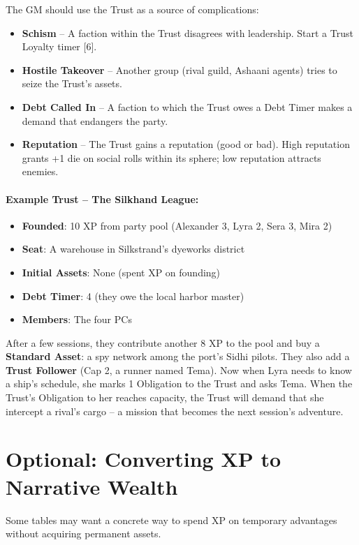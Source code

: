 The GM should use the Trust as a source of complications:

\begin{itemize}
  \item \textbf{Schism} -- A faction within the Trust disagrees with leadership. Start a Trust Loyalty timer [6].
  \item \textbf{Hostile Takeover} -- Another group (rival guild, Ashaani agents) tries to seize the Trust's assets.
  \item \textbf{Debt Called In} -- A faction to which the Trust owes a Debt Timer makes a demand that endangers the party.
  \item \textbf{Reputation} -- The Trust gains a reputation (good or bad). High reputation grants +1 die on social rolls within its sphere; low reputation attracts enemies.
\end{itemize}

\paragraph{Example Trust -- The Silkhand League:}
\begin{itemize}
  \item \textbf{Founded}: 10 XP from party pool (Alexander 3, Lyra 2, Sera 3, Mira 2)
  \item \textbf{Seat}: A warehouse in Silkstrand's dyeworks district
  \item \textbf{Initial Assets}: None (spent XP on founding)
  \item \textbf{Debt Timer}: 4 (they owe the local harbor master)
  \item \textbf{Members}: The four PCs
\end{itemize}
After a few sessions, they contribute another 8 XP to the pool and buy a \textbf{Standard Asset}: a spy network among the port's Sidhi pilots. They also add a \textbf{Trust Follower} (Cap 2, a runner named Tema). Now when Lyra needs to know a ship's schedule, she marks 1 Obligation to the Trust and asks Tema. When the Trust's Obligation to her reaches capacity, the Trust will demand that she intercept a rival's cargo -- a mission that becomes the next session's adventure.

\section{Optional: Converting XP to Narrative Wealth}
\label{sec:xp-narrative-wealth}

Some tables may want a concrete way to spend XP on temporary advantages without acquiring permanent assets.

